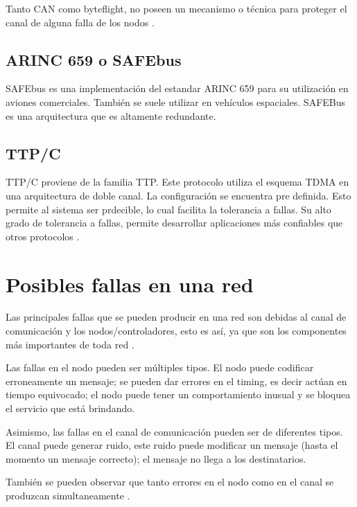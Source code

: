 Tanto CAN como byteflight, no poseen un mecanismo o técnica para proteger el canal de alguna falla de los nodos \citep{Lisner07}.

\subsection{ARINC 659 o SAFEbus}
SAFEbus es una implementación del estandar ARINC 659 para su utilización en aviones comerciales. También se suele utilizar en vehículos espaciales. SAFEBus es una arquitectura que es altamente redundante.

\subsection{TTP/C}
TTP/C proviene de la familia TTP. Este protocolo utiliza el esquema TDMA en una arquitectura de doble canal. La configuración se encuentra pre definida. Esto permite al sistema ser prdecible, lo cual facilita la tolerancia a fallas. Su alto grado de tolerancia a fallas, permite desarrollar aplicaciones más confiables que otros protocolos \citep{Lisner07}.

\section{Posibles fallas en una red}
Las principales fallas que se pueden producir en una red son debidas al canal de comunicación y los nodos/controladores,
esto es así, ya que son los componentes más importantes de toda red \citep{Lisner07}.

Las fallas en el nodo pueden ser múltiples tipos. El nodo puede codificar erroneamente un mensaje; se pueden dar errores en el timing, es decir actúan en tiempo equivocado; el nodo puede tener un comportamiento inusual y se bloquea el servicio que está brindando.

Asimismo, las fallas en el canal de comunicación pueden ser de diferentes tipos. El canal puede generar ruido, este ruido puede modificar un mensaje (hasta el momento un mensaje correcto); el mensaje no llega a los destinatarios.

También se pueden observar que tanto errores en el nodo como en el canal se produzcan simultaneamente \citep{Lisner07}.
